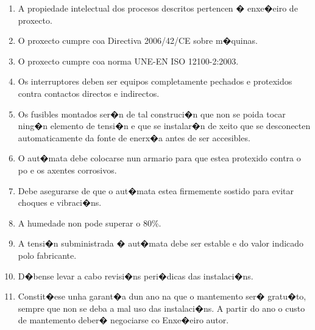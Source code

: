 \documentclass[11pt,twoside]{book}
\begin{document}
\begin{enumerate}
\item A propiedade intelectual dos procesos descritos pertencen � enxe�eiro de proxecto.
\item O proxecto cumpre coa Directiva 2006/42/CE sobre m�quinas.
\item O proxecto cumpre coa norma UNE-EN ISO 12100-2:2003.
\item Os interruptores deben ser equipos completamente pechados e protexidos contra contactos directos e indirectos.
\item Os fusibles montados ser�n de tal construci�n que non se poida tocar ning�n elemento de tensi�n e que se instalar�n de xeito que se desconecten automaticamente da fonte de enerx�a antes de ser accesibles.
\item O aut�mata debe colocarse nun armario para que estea protexido contra o po e os axentes corrosivos.
\item Debe asegurarse de que o aut�mata estea firmemente sostido para evitar choques e vibraci�ns.
\item A humedade non pode superar o 80\%.
\item	 A tensi�n subministrada � aut�mata debe ser estable e do valor indicado polo fabricante.
\item	D�bense levar a cabo revisi�ns peri�dicas das instalaci�ns.
\item	Constit�ese unha garant�a dun ano na que o mantemento ser� gratu�to, sempre que non se deba a mal uso das instalaci�ns. A partir do ano o custo de mantemento deber� negociarse co Enxe�eiro autor.
\end{enumerate}



\stopcontents[parts]
\cleardoublepage
\pagestyle{empty}
\renewcommand{\documento}{ORZAMENTO}
\end{document}
